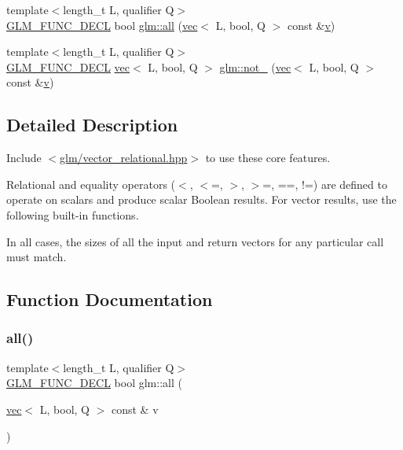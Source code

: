 \begin{DoxyCompactItemize}
\item 
{\footnotesize template$<$length\+\_\+t L, qualifier Q$>$ }\\\mbox{\hyperlink{setup_8hpp_ab2d052de21a70539923e9bcbf6e83a51}{G\+L\+M\+\_\+\+F\+U\+N\+C\+\_\+\+D\+E\+CL}} bool \mbox{\hyperlink{group__core__func__vector__relational_gab5af106b2d5675d51af84815d937384d}{glm\+::all}} (\mbox{\hyperlink{structglm_1_1vec}{vec}}$<$ L, bool, Q $>$ const \&\mbox{\hyperlink{_s_d_l__opengl_8h_a10a82eabcb59d2fcd74acee063775f90}{v}})
\item 
{\footnotesize template$<$length\+\_\+t L, qualifier Q$>$ }\\\mbox{\hyperlink{setup_8hpp_ab2d052de21a70539923e9bcbf6e83a51}{G\+L\+M\+\_\+\+F\+U\+N\+C\+\_\+\+D\+E\+CL}} \mbox{\hyperlink{structglm_1_1vec}{vec}}$<$ L, bool, Q $>$ \mbox{\hyperlink{group__core__func__vector__relational_ga464f1392c934f69a917ab8bb6eda5b09}{glm\+::not\+\_\+}} (\mbox{\hyperlink{structglm_1_1vec}{vec}}$<$ L, bool, Q $>$ const \&\mbox{\hyperlink{_s_d_l__opengl_8h_a10a82eabcb59d2fcd74acee063775f90}{v}})
\end{DoxyCompactItemize}


\subsection{Detailed Description}
Include $<$\mbox{\hyperlink{vector__relational_8hpp}{glm/vector\+\_\+relational.\+hpp}}$>$ to use these core features.

Relational and equality operators ($<$, $<$=, $>$, $>$=, ==, !=) are defined to operate on scalars and produce scalar Boolean results. For vector results, use the following built-\/in functions.

In all cases, the sizes of all the input and return vectors for any particular call must match. 

\subsection{Function Documentation}
\mbox{\label{group__core__func__vector__relational_gab5af106b2d5675d51af84815d937384d}} 
\subsubsection{\texorpdfstring{all()}{all()}}
{\footnotesize\ttfamily template$<$length\+\_\+t L, qualifier Q$>$ \\
\mbox{\hyperlink{setup_8hpp_ab2d052de21a70539923e9bcbf6e83a51}{G\+L\+M\+\_\+\+F\+U\+N\+C\+\_\+\+D\+E\+CL}} bool glm\+::all (\begin{DoxyParamCaption}\item[{\mbox{\hyperlink{structglm_1_1vec}{vec}}$<$ L, bool, Q $>$ const \&}]{v }\end{DoxyParamCaption})}

